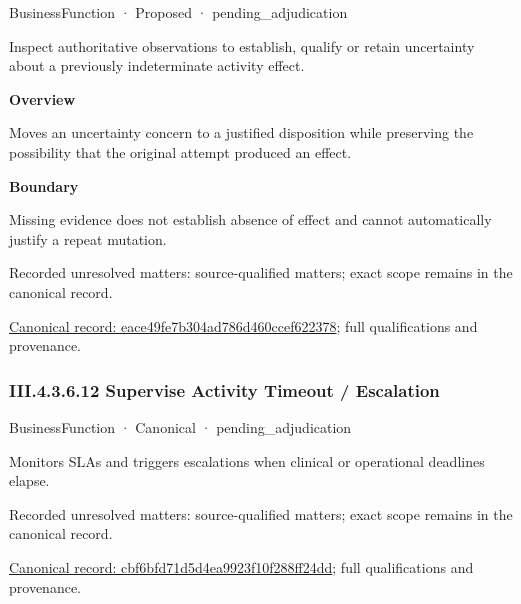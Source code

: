 \label{element:eace49fe7b304ad786d460ccef622378}
{\small BusinessFunction · Proposed · pending\_adjudication}\par

Inspect authoritative observations to establish, qualify or retain uncertainty about a previously indeterminate activity effect.



\textbf{Overview}



Moves an uncertainty concern to a justified disposition while preserving the possibility that the original attempt produced an effect.



\textbf{Boundary}



Missing evidence does not establish absence of effect and cannot automatically justify a repeat mutation.


{\small Recorded unresolved matters: source-qualified matters; exact scope remains in the canonical record.}\par
{\footnotesize \href{../../../../../../../../continuum/business/business-function/eace49fe7b304ad786d460ccef622378.md}{Canonical record: eace49fe7b304ad786d460ccef622378}; full qualifications and provenance.}\par
\subsubsection*{III.4.3.6.12 Supervise Activity Timeout / Escalation}
\label{navigation:III.4.3.6.12}

\label{element:cbf6bfd71d5d4ea9923f10f288ff24dd}
{\small BusinessFunction · Canonical · pending\_adjudication}\par

Monitors SLAs and triggers escalations when clinical or operational deadlines elapse.


{\small Recorded unresolved matters: source-qualified matters; exact scope remains in the canonical record.}\par
{\footnotesize \href{../../../../../../../../continuum/business/business-function/cbf6bfd71d5d4ea9923f10f288ff24dd.md}{Canonical record: cbf6bfd71d5d4ea9923f10f288ff24dd}; full qualifications and provenance.}\par

